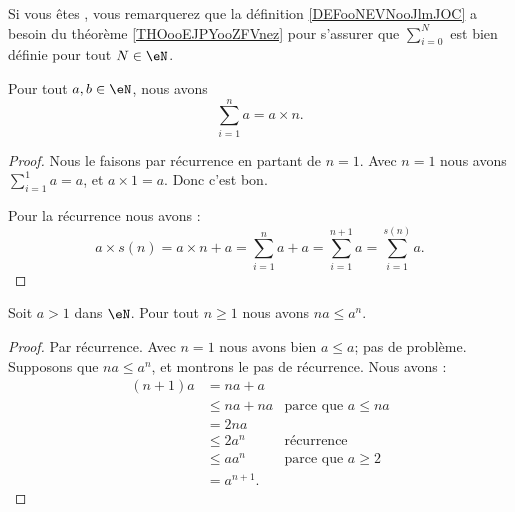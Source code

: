 \begin{normaltext}      \label{NORMooKERZooGWhWwo}
    Si vous êtes , vous remarquerez que la définition \ref{DEFooNEVNooJlmJOC} a besoin du théorème \ref{THOooEJPYooZFVnez} pour s'assurer que \( \sum_{i=0}^N\) est bien définie pour tout \( N\in \eN\).
\end{normaltext}

\begin{proposition}        \label{PROPooXXGHooLafGsI}
    Pour tout \( a,b\in \eN\), nous avons
    \begin{equation}
        \sum_{i=1}^na=a\times n.
    \end{equation}
\end{proposition}

\begin{proof}
    Nous le faisons par récurrence en partant de \( n=1\). Avec \( n=1\) nous avons \( \sum_{i=1}^1a=a\), et \( a\times 1=a\). Donc c'est bon.

    Pour la récurrence nous avons :
    \begin{equation}
        a\times s(n)=a\times n+a=\sum_{i=1}^na+a=\sum_{i=1}^{n+1}a=\sum_{i=1}^{s(n)}a.
    \end{equation}
\end{proof}


\begin{lemma}       \label{LEMooIETGooMyrilW}
    Soit \( a>1\) dans \( \eN\). Pour tout \( n\geq 1\) nous avons \( na\leq a^n\).
\end{lemma}

\begin{proof}
    Par récurrence. Avec \( n=1\) nous avons bien \( a\leq a\); pas de problème. Supposons que \( na\leq a^n\), et montrons le pas de récurrence. Nous avons :
    \begin{subequations}
        \begin{align}
            (n+1)a&=na+a\\
            &\leq na+na     &\text{parce que }  a\leq na\\
            &=2na\\
            &\leq 2a^n      &\text{récurrence}\\
            &\leq aa^n       &\text{parce que } a\geq 2\\
            &=a^{n+1}.
        \end{align}
    \end{subequations}
\end{proof}

